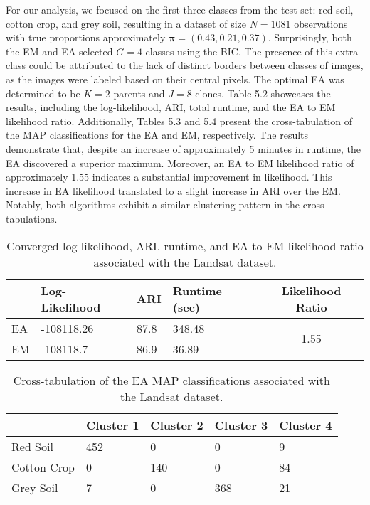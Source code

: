 \documentclass[12pt]{report}
\begin{document}
For our analysis, we focused on the first three classes from the test set: red soil, cotton crop, and grey soil, resulting in a dataset of size $N = 1081$ observations with true proportions approximately $\bm{\pi} = (0.43, 0.21, 0.37)$. Surprisingly, both the EM and EA selected $G=4$ classes using the BIC. The presence of this extra class could be attributed to the lack of distinct borders between classes of images, as the images were labeled based on their central pixels. The optimal EA was determined to be $K=2$ parents and $J=8$ clones. Table 5.2 showcases the results, including the log-likelihood, ARI, total runtime, and the EA to EM likelihood ratio. Additionally, Tables 5.3 and 5.4 present the cross-tabulation of the MAP classifications for the EA and EM, respectively. The results demonstrate that, despite an increase of approximately 5 minutes in runtime, the EA discovered a superior maximum. Moreover, an EA to EM likelihood ratio of approximately 1.55 indicates a substantial improvement in likelihood. This increase in EA likelihood translated to a slight increase in ARI over the EM. Notably, both algorithms exhibit a similar clustering pattern in the cross-tabulations.


\newpage

\begin{table}[!htbp]
  \caption{Converged log-likelihood, ARI, runtime, and EA to EM likelihood ratio associated with the Landsat dataset.}
    \vspace{0.5cm}
  \begin{tabularx}{\textwidth}{l *{3}{X}c}
  \toprule
    &\textbf{Log-Likelihood}& \textbf{ARI} & \textbf{Runtime (sec)} & \textbf{Likelihood Ratio} \\
  \midrule
   EA & -108118.26     & 87.8 &  348.48 & \multirow{2}{*}{1.55}\\
  EM & -108118.7          & 86.9 & 36.89    \\
  \bottomrule
  \end{tabularx}
\end{table}

\begin{table}[!htbp]
  \caption{Cross-tabulation of the EA MAP classifications associated with the Landsat dataset.}
    \vspace{0.5cm}
  \begin{tabularx}{\textwidth}{l *{4}{X}}
  \toprule
   &\textbf{Cluster 1}  & \textbf{Cluster 2}  & \textbf{Cluster 3}  & \textbf{Cluster 4}   \\
  \midrule
  Red Soil & 	452 & 0 & 0 & 9\\
  Cotton Crop &0 & 140 &  0 & 84 \\
   Grey Soil &   7 & 0 &  368  & 21\\
  \bottomrule
  \end{tabularx}
\end{table}
\end{document}
